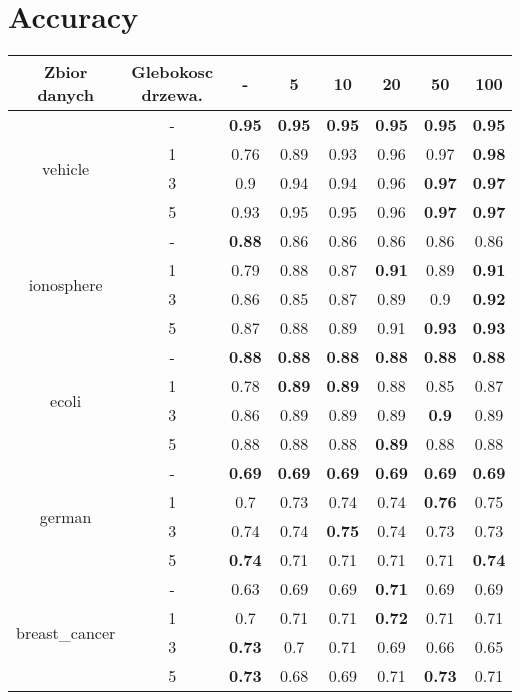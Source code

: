 \documentclass{article}%
\begin{document}
%
\normalsize%
\section*{Accuracy}%
\begin{longtable}{c|c|cccccc}%
\hline%
Zbior danych&Glebokosc drzewa.&{-}&5&10&20&50&100\\%
\hline%
\multirow{4}{*}{vehicle}&{-}&\textbf{0.95}&\textbf{0.95}&\textbf{0.95}&\textbf{0.95}&\textbf{0.95}&\textbf{0.95}\\%
\cline{2%
-%
8}%
&1&0.76&0.89&0.93&0.96&0.97&\textbf{0.98}\\%
\cline{2%
-%
8}%
&3&0.9&0.94&0.94&0.96&\textbf{0.97}&\textbf{0.97}\\%
\cline{2%
-%
8}%
&5&0.93&0.95&0.95&0.96&\textbf{0.97}&\textbf{0.97}\\%
\hline%
\multirow{4}{*}{ionosphere}&{-}&\textbf{0.88}&0.86&0.86&0.86&0.86&0.86\\%
\cline{2%
-%
8}%
&1&0.79&0.88&0.87&\textbf{0.91}&0.89&\textbf{0.91}\\%
\cline{2%
-%
8}%
&3&0.86&0.85&0.87&0.89&0.9&\textbf{0.92}\\%
\cline{2%
-%
8}%
&5&0.87&0.88&0.89&0.91&\textbf{0.93}&\textbf{0.93}\\%
\hline%
\multirow{4}{*}{ecoli}&{-}&\textbf{0.88}&\textbf{0.88}&\textbf{0.88}&\textbf{0.88}&\textbf{0.88}&\textbf{0.88}\\%
\cline{2%
-%
8}%
&1&0.78&\textbf{0.89}&\textbf{0.89}&0.88&0.85&0.87\\%
\cline{2%
-%
8}%
&3&0.86&0.89&0.89&0.89&\textbf{0.9}&0.89\\%
\cline{2%
-%
8}%
&5&0.88&0.88&0.88&\textbf{0.89}&0.88&0.88\\%
\hline%
\multirow{4}{*}{german}&{-}&\textbf{0.69}&\textbf{0.69}&\textbf{0.69}&\textbf{0.69}&\textbf{0.69}&\textbf{0.69}\\%
\cline{2%
-%
8}%
&1&0.7&0.73&0.74&0.74&\textbf{0.76}&0.75\\%
\cline{2%
-%
8}%
&3&0.74&0.74&\textbf{0.75}&0.74&0.73&0.73\\%
\cline{2%
-%
8}%
&5&\textbf{0.74}&0.71&0.71&0.71&0.71&\textbf{0.74}\\%
\hline%
\multirow{4}{*}{breast\_cancer}&{-}&0.63&0.69&0.69&\textbf{0.71}&0.69&0.69\\%
\cline{2%
-%
8}%
&1&0.7&0.71&0.71&\textbf{0.72}&0.71&0.71\\%
\cline{2%
-%
8}%
&3&\textbf{0.73}&0.7&0.71&0.69&0.66&0.65\\%
\cline{2%
-%
8}%
&5&\textbf{0.73}&0.68&0.69&0.71&\textbf{0.73}&0.71\\%

\end{longtable}
\end{document}
